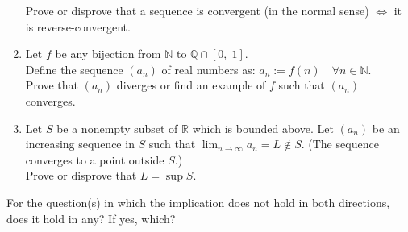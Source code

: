 \documentclass{article}
\begin{document}
\begin{enumerate}
	Prove or disprove that a sequence is convergent (in the normal sense) $\iff$ it is reverse-convergent.
	\item Let $f$ be any bijection from $\mathbb{N}$ to $\mathbb{Q} \cap [0,\; 1].$\\
	Define the sequence $(a_n)$ of real numbers as: $a_n := f(n) \quad \forall n \in \mathbb{N}.$\\
	Prove that $(a_n)$ diverges or find an example of $f$ such that $(a_n)$ converges.
	\item Let $S$ be a nonempty subset of $\mathbb{R}$ which is bounded above. Let $(a_n)$ be an increasing sequence in $S$ such that $\displaystyle\lim_{n\to \infty}a_n = L \not\in S.$ (The sequence converges to a point outside $S.$)\\
	 Prove or disprove that $L = \sup S.$ 
\end{enumerate}
For the question(s) in which the implication does not hold in both directions, does it hold in any? If yes, which?
\end{document}
